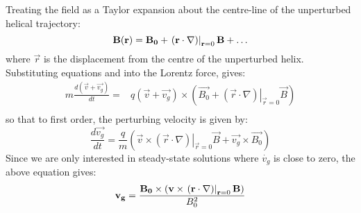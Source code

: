 Treating the field as a Taylor expansion about the centre-line of the unperturbed helical trajectory:
\begin{equation}
\vec{B}(\vec{r})=\vec{B_0}+\left.(\vec{r}\cdot\nabla)\right|_{\vec{r}=0}\vec{B}+\ldots
\eqlabel{B-field-taylor}
\end{equation}
where $\vec{r}$ is the displacement from the centre of the unperturbed helix.
Substituting equations  and  into the Lorentz force, gives:
\begin{align}
m\frac{d(\vec{v}+\vec{v_g})}{dt}=&q(\vec{v}+\vec{v_g})\times\left(\vec{B_0}+\left.(\vec{r}\cdot\nabla)\right|_{\vec{r}=0}\vec{B}\right) \\
\end{align}
so that to first order, the perturbing velocity is given by:
\begin{equation}
\frac{d\vec{v_g}}{dt}=\frac{q}{m}\left(\vec{v}\times\left.(\vec{r}\cdot\nabla)\right|_{\vec{r}=0}\vec{B}+\vec{v_g}\times\vec{B_0}\right)
\end{equation}
Since we are only interested in steady-state solutions where $\dot{v_{g}}$ is close to zero, the above equation gives:
\begin{equation}
\vec{v_g}=\frac{\vec{B_0}\times\left(\vec{v}\times\left.(\vec{r}\cdot\nabla)\right|_{\vec{r}=0}\vec{B}\right)}{B^2_0}
\eqlabel{app:bentSol:gradB:fullVector}
\end{equation}

